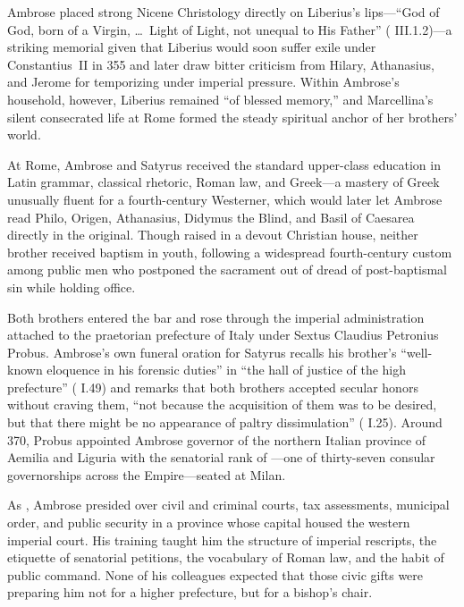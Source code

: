 Ambrose placed strong Nicene Christology directly on Liberius's lips---``God of God, born of a Virgin, \ldots\ Light of Light, not unequal to His Father'' ( III.1.2)---a striking memorial given that Liberius would soon suffer exile under Constantius~II in 355 and later draw bitter criticism from Hilary, Athanasius, and Jerome for temporizing under imperial pressure. Within Ambrose's household, however, Liberius remained ``of blessed memory,'' and Marcellina's silent consecrated life at Rome formed the steady spiritual anchor of her brothers' world.

At Rome, Ambrose and Satyrus received the standard upper-class education in Latin grammar, classical rhetoric, Roman law, and Greek---a mastery of Greek unusually fluent for a fourth-century Westerner, which would later let Ambrose read Philo, Origen, Athanasius, Didymus the Blind, and Basil of Caesarea directly in the original. Though raised in a devout Christian house, neither brother received baptism in youth, following a widespread fourth-century custom among public men who postponed the sacrament out of dread of post-baptismal sin while holding office.

Both brothers entered the bar and rose through the imperial administration attached to the praetorian prefecture of Italy under Sextus Claudius Petronius Probus. Ambrose's own funeral oration for Satyrus recalls his brother's ``well-known eloquence in his forensic duties'' in ``the hall of justice of the high prefecture'' ( I.49) and remarks that both brothers accepted secular honors without craving them, ``not because the acquisition of them was to be desired, but that there might be no appearance of paltry dissimulation'' ( I.25). Around 370, Probus appointed Ambrose governor of the northern Italian province of Aemilia and Liguria with the senatorial rank of ---one of thirty-seven consular governorships across the Empire---seated at Milan.


As , Ambrose presided over civil and criminal courts, tax assessments, municipal order, and public security in a province whose capital housed the western imperial court. His training taught him the structure of imperial rescripts, the etiquette of senatorial petitions, the vocabulary of Roman law, and the habit of public command. None of his colleagues expected that those civic gifts were preparing him not for a higher prefecture, but for a bishop's chair.
